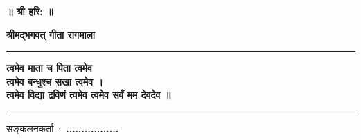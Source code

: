 \documentclass[24pt, a4paper, oneside]{book} %
\begin{document}
\begin{titlepage}
\newpage
\thispagestyle{empty}

\vspace*{0.5cm}
\begin{center}
    \fontsize{20pt}{20pt}\selectfont
    \bfseries
   \hspace{0.1cm}॥ श्री हरि: ॥\hspace{0.1cm}
\end{center}

\vspace{1cm}
\begin{center}
    \fontsize{42pt}{42pt}\selectfont
    \bfseries
  श्रीमद्भगवत् गीता रागमाला
\end{center}

\vfill

\begin{center}
  \rule{0.45\linewidth}{5pt}  %
\end{center}

\vspace{-0.5cm}

\begin{center}
  \begin{minipage}{0.47\linewidth}
    \fontsize{24pt}{24pt}\selectfont %
    \bfseries
    \setlength{\parindent}{2pt}
    त्वमेव माता च पिता त्वमेव\\
    त्वमेव \hspace*{0.0050cm}बन्धुश्च\hspace*{0.0050cm} सखा \hspace*{0.010cm}त्वमेव ।\\
    त्वमेव  विद्या द्रविणं त्वमेव
    त्वमेव \hspace*{0.30cm} सर्वं \hspace*{0.25cm} मम देवदेव ॥
  \end{minipage}
\end{center}

\vspace{-0.5cm}

\begin{center}
  \rule{0.45\linewidth}{5pt}
\end{center}

\vfill

\begin{center}
    \fontsize{24pt}{24pt}\selectfont
   सङ्कलनकर्ता~:~\textbf{.................}
\end{center}
\end{titlepage}
\end{document}
